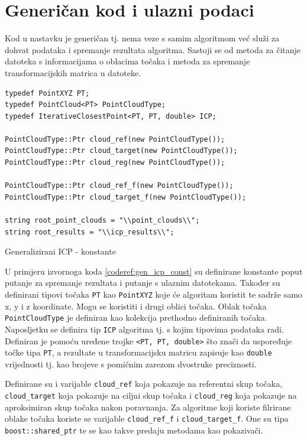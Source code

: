 \section{Generičan kod i ulazni podaci}

Kod u nastavku je generičan tj. nema veze s samim algoritmom već služi za dohvat podataka i spremanje rezultata algoritma. Sastoji se od metoda za čitanje datoteka s informacijama o oblacima točaka i metoda za spremanje transformacijskih matrica u datoteke. 

\begin{listing}[h!]
  \begin{verbatim}
typedef PointXYZ PT;
typedef PointCloud<PT> PointCloudType;
typedef IterativeClosestPoint<PT, PT, double> ICP;

PointCloudType::Ptr cloud_ref(new PointCloudType());
PointCloudType::Ptr cloud_target(new PointCloudType());
PointCloudType::Ptr cloud_reg(new PointCloudType());

PointCloudType::Ptr cloud_ref_f(new PointCloudType());
PointCloudType::Ptr cloud_target_f(new PointCloudType());

string root_point_clouds = "\\point_clouds\\";
string root_results = "\\icp_results\\";
  \end{verbatim}
  \caption{Generalizirani ICP - konstante}
  \label{coderef:gen_icp_const}
\end{listing}

U primjeru izvornoga koda \ref{coderef:gen_icp_const} su definirane konstante poput putanje za spremanje rezultata i putanje s ulaznim datotekama. Također su definirani tipovi točaka \texttt{PT} kao \texttt{PointXYZ} koje će algoritam koristit te sadrže samo x, y i z koordinate. Mogu se koristiti i drugi oblici točaka. Oblak točaka \texttt{PointCloudType} je definiran kao kolekcija prethodno definiranih točaka. Naposljetku se definira tip \texttt{ICP} algoritma tj. s kojim tipovima podataka radi. Definiran je pomoću uređene trojke \texttt{<PT, PT, double>} što znači da uspoređuje točke tipa \texttt{PT}, a rezultate u transformacijsku matricu zapisuje kao \texttt{double} vrijednosti tj. kao brojeve s pomičnim zarezom dvostruke preciznosti.

Definirane su i varijable \texttt{cloud_ref} koja pokazuje na referentni skup točaka, \texttt{cloud_target} koja pokazuje na ciljni skup točaka i \texttt{cloud_reg} koja pokazuje na aproksimiran skup točaka nakon poravnanja. Za algoritme koji koriste filrirane oblake točaka koriste se varijable \texttt{cloud_ref_f} i \texttt{cloud_target_f}. One su tipa \texttt{boost::shared_ptr} te se kao takve predaju metodama kao pokazivači.

